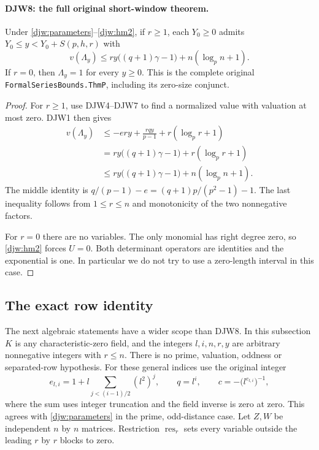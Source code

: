 \documentclass[11pt,a4paper]{article}
\numberwithin{equation}{section}
\theoremstyle{remark}\newtheorem{remark}[theorem]{Remark}
\begin{document}
\paragraph{DJW8: the full original short-window theorem.}
\label{claim:DJW8}
Under \eqref{djw:parameters}--\eqref{djw:hm2}, if $r\ge1$,
each $Y_0\ge0$ admits $Y_0\le y<Y_0+S(p,h,r)$ with
\begin{equation}
 v(\Lambda_y)\le
 ry\bigl((q+1)\gamma-1\bigr)+n(\log_p n+1).
 \label{djw:thmp}
\end{equation}
If $r=0$, then $\Lambda_y=1$ for every $y\ge0$.
This is the complete original
\texttt{Formal\allowbreak Series\allowbreak Bounds.\allowbreak Thm\allowbreak P}, including its zero-size conjunct.

\begin{proof}
For $r\ge1$, use DJW4--DJW7 to find a normalized value with
valuation at most zero.  DJW1 then gives
\begin{align*}
 v(\Lambda_y)
 &\le-ery+\frac{rqy}{p-1}+r(\log_pr+1)\\
 &=ry\bigl((q+1)\gamma-1\bigr)+r(\log_pr+1)\\
 &\le ry\bigl((q+1)\gamma-1\bigr)+n(\log_pn+1).
\end{align*}
The middle identity is $q/(p-1)-e=(q+1)p/(p^2-1)-1$.
The last inequality follows from $1\le r\le n$ and monotonicity
of the two nonnegative factors.

For $r=0$ there are no variables.  The only monomial has right
degree zero, so \eqref{djw:hm2} forces $U=0$.  Both determinant
operators are identities and the exponential is one.  In particular
we do not try to use a zero-length interval in this case.
\end{proof}

\subsection{The exact row identity}

The next algebraic statements have a wider scope than DJW8.
In this subsection $K$ is any characteristic-zero field, and the
integers $l,i,n,r,y$ are arbitrary nonnegative integers with $r\le n$.
There is no prime, valuation, oddness or separated-row hypothesis.
For these general indices use the original integer
\[
 e_{l,i}=1+l\sum_{j<(i-1)/2}(l^2)^j,
 \qquad q=l^i,\qquad c=-\bigl(l^{e_{l,i}}\bigr)^{-1},
\]
where the sum uses integer truncation and the field inverse is zero
at zero.  This agrees with \eqref{djw:parameters} in the prime,
odd-distance case.  Let $Z,W$ be independent $n$ by $n$ matrices.
Restriction $\operatorname{res}_r$ sets every variable outside the
leading $r$ by $r$ blocks to zero.
\end{document}
